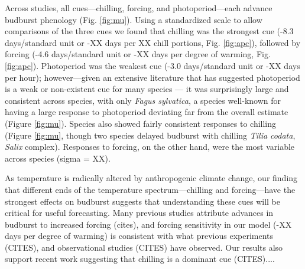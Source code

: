 \documentclass[11pt,letter]{article}
\begin{document}
\par Across studies, all cues---chilling, forcing, and photoperiod---each advance budburst phenology (Fig. \ref {fig:mu}). Using a standardized scale to allow comparisons of the three cues we found that chilling was the strongest cue (-8.3 days/standard unit or -XX days per XX chill portions, Fig. \ref {fig:apc}), followed by forcing (-4.6 days/standard unit or -XX days per degree of warming, Fig. \ref {fig:apc}). Photoperiod was the weakest cue (-3.0 days/standard unit or -XX days per hour); however---given an extensive literature that has suggested photoperiod is a weak or non-existent cue for many species \citep{zohner2016,koerner2010a}--- it was surprisingly large and consistent across species, with only \emph{Fagus sylvatica}, a species well-known for having a large response to photoperiod deviating far from the overall estimate (Figure \ref {fig:mu}). Species also showed fairly consistent responses to chilling (Figure \ref {fig:mu}, though two species delayed budburst with chilling \emph{Tilia codata}, \emph{Salix} complex). Responses to forcing, on the other hand, were the most variable across species (sigma = XX).

\par As temperature is radically altered by anthropogenic climate change, our finding that different ends of the temperature spectrum---chilling and forcing---have the strongest effects on budburst suggests that understanding these cues will be critical for useful forecasting. Many previous studies attribute advances in budburst to increased forcing (cites), and forcing sensitivity in our model (-XX days per degree of warming) is consistent with what previous experiments (CITES), and observational studies (CITES) have observed. Our results also support recent work suggesting that chilling is a dominant cue (CITES).... %
\end{document}
